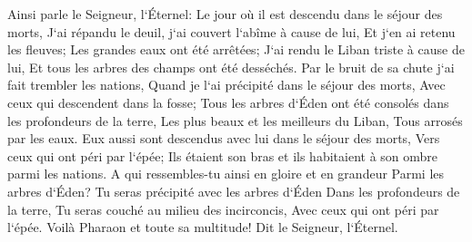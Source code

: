 \verse Ainsi parle le Seigneur, l`Éternel: Le jour où il est descendu dans le séjour des morts, J`ai répandu le deuil, j`ai couvert l`abîme à cause de lui, Et j`en ai retenu les fleuves; Les grandes eaux ont été arrêtées; J`ai rendu le Liban triste à cause de lui, Et tous les arbres des champs ont été desséchés. 
\verse Par le bruit de sa chute j`ai fait trembler les nations, Quand je l`ai précipité dans le séjour des morts, Avec ceux qui descendent dans la fosse; Tous les arbres d`Éden ont été consolés dans les profondeurs de la terre, Les plus beaux et les meilleurs du Liban, Tous arrosés par les eaux. 
\verse Eux aussi sont descendus avec lui dans le séjour des morts, Vers ceux qui ont péri par l`épée; Ils étaient son bras et ils habitaient à son ombre parmi les nations. 
\verse A qui ressembles-tu ainsi en gloire et en grandeur Parmi les arbres d`Éden? Tu seras précipité avec les arbres d`Éden Dans les profondeurs de la terre, Tu seras couché au milieu des incirconcis, Avec ceux qui ont péri par l`épée. Voilà Pharaon et toute sa multitude! Dit le Seigneur, l`Éternel. 

